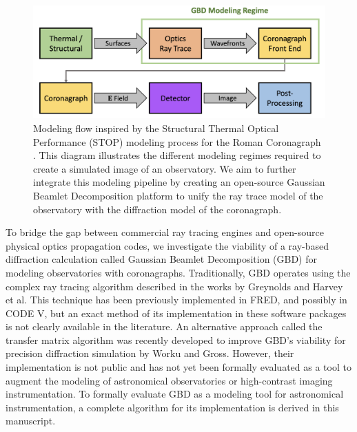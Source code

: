 \begin{figure}[H]
	\centering
	\includegraphics[width=\textwidth]{modeling_flow.png}
	\caption{Modeling flow inspired by the Structural Thermal Optical Performance (STOP) modeling process for the Roman Coronagraph \cite{Krist18}. This diagram illustrates the different modeling regimes required to create a simulated image of an observatory. We aim to further integrate this modeling pipeline by creating an open-source Gaussian Beamlet Decomposition platform to unify the ray trace model of the observatory with the diffraction model of the coronagraph.}
    \label{fig:modeling_flow}
\end{figure} 

To bridge the gap between commercial ray tracing engines and open-source physical optics propagation codes, we investigate the viability of a ray-based diffraction calculation called Gaussian Beamlet Decomposition (GBD) for modeling observatories with coronagraphs. Traditionally, GBD operates using the complex ray tracing algorithm described in the works by Greynolds\cite{Greynolds86} and Harvey et al\cite{Harvey15}. This technique has been previously implemented in FRED\cite{modeling_coherence_fred,Harvey15}, and possibly in CODE V\cite{bsp_in_codev}, but an exact method of its implementation in these software packages is not clearly available in the literature. An alternative approach called the transfer matrix algorithm was recently developed to improve GBD's viability for precision diffraction simulation by Worku and Gross\cite{Worku17,Worku:18,Worku19}. However, their implementation is not public and has not yet been formally evaluated as a tool to augment the modeling of astronomical observatories or high-contrast imaging instrumentation. To formally evaluate GBD as a modeling tool for astronomical instrumentation, a complete algorithm for its implementation is derived in this manuscript.

